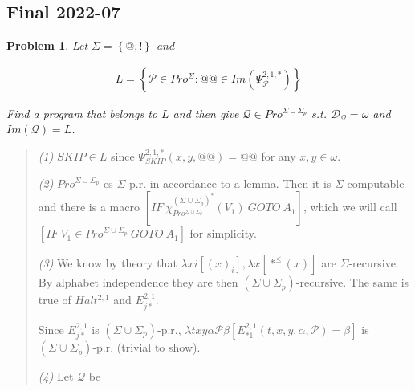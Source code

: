 \documentclass[a4paper, 12pt]{article}
\newtheorem{problem}{Problem}
\newtheorem{problem}{Problem}
\begin{document}
\subsection{Final 2022-07}

\begin{problem}
    Let $\Sigma = \left\{ @, ! \right\} $ and 

    \begin{align*}
        L = \left\{ \mathcal{P} \in Pro^{\Sigma} : @@ \in Im\left( \Psi_{\mathcal{P}}^{2, 1, *} \right)  \right\} 
    \end{align*}

    Find a program that belongs to $L$ and then give $\mathcal{Q}\in Pro^{\Sigma
    \cup \Sigma_p}$ s.t. $\mathcal{D}_{\mathcal{Q}} = \omega$ and
    $Im(\mathcal{Q}) = L$.
\end{problem}


\small
\begin{quote}

\textit{(1)} $SKIP \in L$ since $\Psi_{SKIP}^{2, 1, *}(x, y, @@) = @@$ for any
$x, y \in \omega$.

\textit{(2)} $Pro^{\Sigma \cup \Sigma_p}$ es $\Sigma$-p.r. in accordance to a
lemma. Then it is $\Sigma$-computable and there is a macro $[IF ~
\chi_{Pro^{\Sigma \cup \Sigma_p}}^{(\Sigma \cup \Sigma_p)^*}(V_1) ~ GOTO ~
A_1]$, which we will call $\left[ IF ~ V_1 \in Pro^{\Sigma \cup \Sigma_p} ~ GOTO
~ A_1\right] $ for simplicity.

\textit{(3)} We know by theory that $\lambda xi \left[ (x)_i  \right], \lambda x
\left[ *^{\leq}(x)  \right]$ are $\Sigma$-recursive. By alphabet independence
they are then $( \Sigma \cup \Sigma_p )$-recursive. The same is true of
$Halt^{2, 1}$ and $E_{j*}^{2, 1}$. 

Since $E_{j*}^{2, 1}$ is $(\Sigma \cup \Sigma_p)$-p.r., $\lambda txy \alpha \mathcal{P} \beta \left[ E_{*1}^{2, 1}(t, x, y, \alpha, \mathcal{P}) =
\beta\right]$ is $(\Sigma \cup \Sigma_p)$-p.r. (trivial to show). 

\textit{(4)} Let $\mathcal{Q}$ be

\end{quote}
\normalsize
\end{document}
